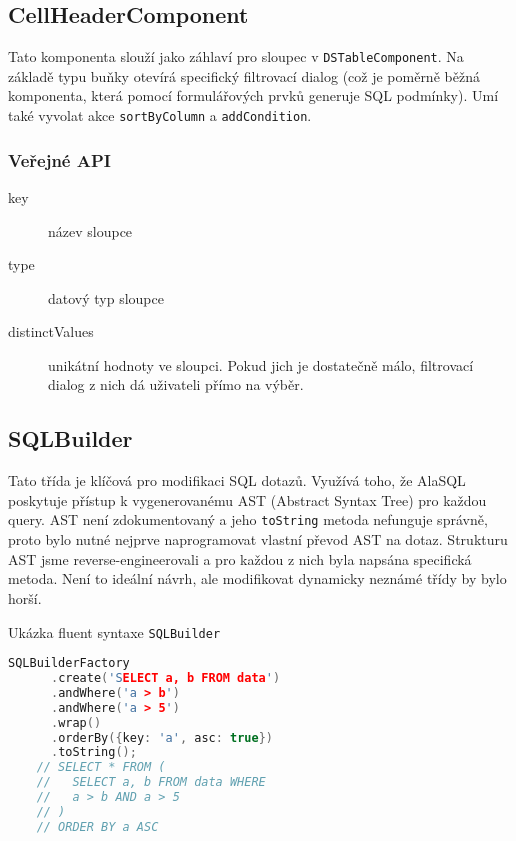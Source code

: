\subsection{CellHeaderComponent}

Tato komponenta slouží jako záhlaví pro sloupec v \lstinline|DSTableComponent|. Na základě typu buňky otevírá specifický filtrovací dialog (což je poměrně běžná komponenta, která pomocí formulářových prvků generuje SQL podmínky). Umí také vyvolat akce \lstinline|sortByColumn| a \lstinline|addCondition|.

\subsubsection*{Veřejné API}

\begin{description}
  \item[key] název sloupce
  \item[type] datový typ sloupce
  \item[distinctValues] unikátní hodnoty ve sloupci. Pokud jich je dostatečně málo, filtrovací dialog z nich dá uživateli přímo na výběr.
\end{description}

\subsection{SQLBuilder}

Tato třída je klíčová pro modifikaci SQL dotazů. Využívá toho, že AlaSQL poskytuje přístup k vygenerovanému AST (Abstract Syntax Tree) pro každou query. AST není zdokumentovaný a jeho \lstinline|toString| metoda nefunguje správně, proto bylo nutné nejprve naprogramovat vlastní převod AST na dotaz. Strukturu AST jsme reverse-engineerovali a pro každou z nich byla napsána specifická metoda. Není to ideální návrh, ale modifikovat dynamicky neznámé třídy by bylo horší.

\begin{exmp}
  Ukázka fluent syntaxe \/\lstinline|SQLBuilder|

  \begin{lstlisting}[language=c++]
    SQLBuilderFactory
      .create('SELECT a, b FROM data')
      .andWhere('a > b')
      .andWhere('a > 5')
      .wrap()
      .orderBy({key: 'a', asc: true})
      .toString();
    // SELECT * FROM (
    //   SELECT a, b FROM data WHERE
    //   a > b AND a > 5
    // )
    // ORDER BY a ASC
  \end{lstlisting}
\end{exmp}

